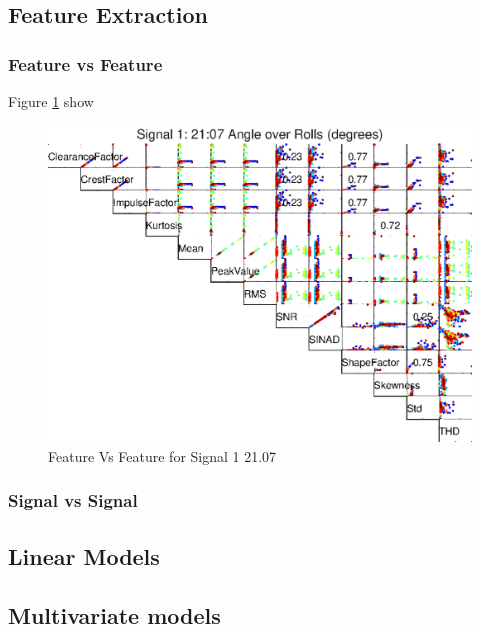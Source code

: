 \documentclass{article}
\begin{document}
\subsection{Feature Extraction}
\subsubsection{Feature vs Feature}
Figure \ref{fig:FeatureVsFeatureSignal1} show 
\begin{figure}[H]
    \centering
    \includegraphics[width=\textwidth, height=\textheight, keepaspectratio]{figures/FeatureVsFeatureSignal1.eps}
    \caption{Feature Vs Feature for Signal 1 21.07}
    \label{fig:FeatureVsFeatureSignal1}
\end{figure}
\subsubsection{Signal vs Signal}
\subsection{Linear Models}
\subsection{Multivariate models}

\clearpage 
\end{document}
